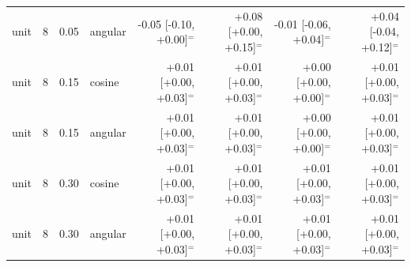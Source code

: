 \begin{tabular}{lrrlrrrr}
unit & 8 & 0.05 & angular & -0.05 [-0.10, +0.00]$^{=}$ & +0.08 [+0.00, +0.15]$^{=}$ & -0.01 [-0.06, +0.04]$^{=}$ & +0.04 [-0.04, +0.12]$^{=}$ \\
unit & 8 & 0.15 & cosine & +0.01 [+0.00, +0.03]$^{=}$ & +0.01 [+0.00, +0.03]$^{=}$ & +0.00 [+0.00, +0.00]$^{=}$ & +0.01 [+0.00, +0.03]$^{=}$ \\
unit & 8 & 0.15 & angular & +0.01 [+0.00, +0.03]$^{=}$ & +0.01 [+0.00, +0.03]$^{=}$ & +0.00 [+0.00, +0.00]$^{=}$ & +0.01 [+0.00, +0.03]$^{=}$ \\
unit & 8 & 0.30 & cosine & +0.01 [+0.00, +0.03]$^{=}$ & +0.01 [+0.00, +0.03]$^{=}$ & +0.01 [+0.00, +0.03]$^{=}$ & +0.01 [+0.00, +0.03]$^{=}$ \\
unit & 8 & 0.30 & angular & +0.01 [+0.00, +0.03]$^{=}$ & +0.01 [+0.00, +0.03]$^{=}$ & +0.01 [+0.00, +0.03]$^{=}$ & +0.01 [+0.00, +0.03]$^{=}$ \\
\bottomrule
\end{tabular}
